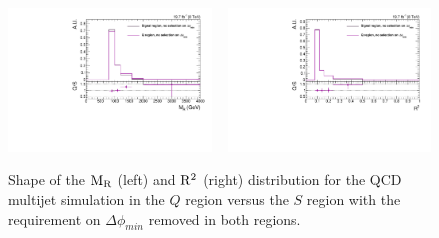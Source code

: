\begin{figure}[htbp]
\centering
\includegraphics[width=0.48\textwidth]
{figures/razor_selection/shapeplots/MR_comparison_QCD_SIG_no_deltaphimin}
~
\includegraphics[width=0.48\textwidth]
{figures/razor_selection/shapeplots/R2_comparison_QCD_SIG_no_deltaphimin}
\caption{Shape of the $\mathrm{M_R}$ (left) and $\mathrm{R^2}$ (right) distribution for the QCD multijet simulation
in the $Q$ region versus the $S$ region with the requirement on  $\Delta\phi_{min}$ removed in both
regions. 
\label{fig:boost_Q_region_shape_no_mindeltaphi}}
\end{figure}



